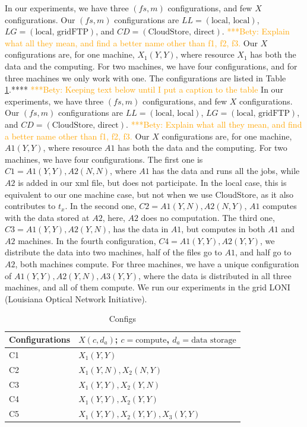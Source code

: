 \documentclass{rspublic}
\newcommand{\betynote}[1]{ {\textcolor{orange} { ***Bety: #1 }}}
\begin{document}
In our experiments, we have three $(fs, m)$ configurations, and few $X$ configurations. Our $(fs, m)$ configurations are $LL=(\mbox{local, local})$, $LG=(\mbox{local, gridFTP})$, and $CD=(\mbox{CloudStore, direct})$.\betynote{Explain what all they mean, and find a better name other than f1, f2, f3.} Our $X$ configurations are, for one machine, $X_1(Y,Y)$, where resource $X_1$ has both the data and the computing. For two machines, we have four configurations, and for three machines we only work with one. The configurations are listed in Table \ref{Tab:Configs}.****
\betynote{Keeping text below until I put a caption to the table}
In our experiments, we have three $(fs, m)$ configurations, and few $X$
configurations. Our $(fs, m)$ configurations are $LL=(\mbox{local,
local})$, $LG=(\mbox{local, gridFTP})$, and $CD=(\mbox{CloudStore,
direct})$.\betynote{Explain what all they mean, and find a better name
other than f1, f2, f3.} Our $X$ configurations are, for one machine,
$A1(Y,Y)$, where resource $A1$ has both the data and the computing. For
two machines, we have four configurations. The first one is $C1=A1(Y,
Y), A2(N, N)$, where $A1$ has the data and runs all the jobs, while $A2$
is added in our xml file, but does not participate. In the local case,
this is equivalent to our one machine case, but not when we use
CloudStore, as it also contributes to $t_x$. In the second one,
$C2=A1(Y, N), A2(N, Y)$, $A1$ computes with the data stored at $A2$,
here, $A2$ does no computation. The third one, $C3=A1(Y, Y), A2(Y, N)$,
has the data in $A1$, but computes in both $A1$ and $A2$ machines. In
the fourth configuration, $C4=A1(Y, Y), A2(Y, Y)$, we distribute the
data into two machines, half of the files go to $A1$, and half go to
$A2$, both machines compute. For three machines, we have a unique
configuration of $A1(Y, Y), A2(Y, N), A3(Y, Y)$, where the data is
distributed in all three machines, and all of them compute. We run our
experiments in the grid LONI (Louisiana Optical Network Initiative).

\begin{table}
\begin{center}
    \begin{tabular}{ | l | l |}
    \hline
    Configurations & $X(c,d_a)$; $c= \mbox{compute}$, $d_a=\mbox{data storage}$  \\ \hline
    C1 & $X_1(Y,Y)$  \\ \hline
    C2 & $X_1(Y,N), X_2(N,Y)$ \\ \hline
    C3 & $X_1(Y,Y), X_2(Y,N)$ \\ \hline
    C4 & $X_1(Y,Y), X_2(Y,Y)$ \\ \hline
    C5 & $X_1(Y,Y), X_2(Y,Y), X_3(Y,Y)$ \\ 
    \hline
    \end{tabular}
\end{center}
    \caption{Configs}
    \label{Tab:Configs}
\end{table}
\end{document}
